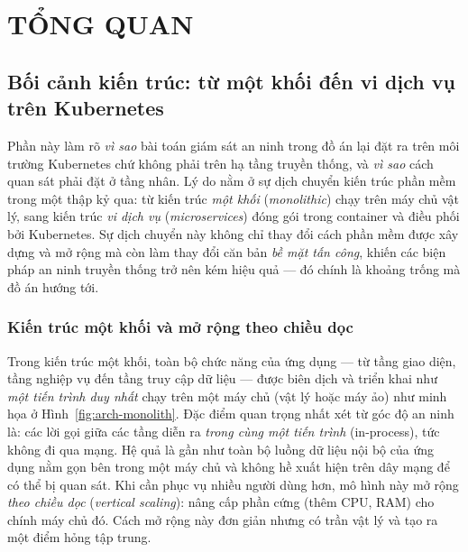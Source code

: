 
\chapter{TỔNG QUAN}
\label{ch:overview}

\section{Bối cảnh kiến trúc: từ một khối đến vi dịch vụ trên Kubernetes}
\label{sec:arch-context}

Phần này làm rõ \emph{vì sao} bài toán
giám sát an ninh trong đồ án lại đặt ra trên môi trường Kubernetes chứ không phải trên
hạ tầng truyền thống, và \emph{vì sao} cách quan sát phải đặt ở tầng nhân. Lý do nằm ở
sự dịch chuyển kiến trúc phần mềm trong một thập kỷ qua: từ kiến trúc \emph{một khối}
(\textit{monolithic}) chạy trên máy chủ vật lý, sang kiến trúc \emph{vi dịch vụ}
(\textit{microservices}) đóng gói trong container và điều phối bởi Kubernetes. Sự dịch
chuyển này không chỉ thay đổi cách phần mềm được xây dựng và mở rộng mà còn làm thay đổi
căn bản \emph{bề mặt tấn công}, khiến các biện pháp an ninh truyền thống trở nên kém hiệu
quả --- đó chính là khoảng trống mà đồ án hướng tới.

\subsection{Kiến trúc một khối và mở rộng theo chiều dọc}

Trong kiến trúc một khối, toàn bộ chức năng của ứng dụng --- từ tầng giao diện, tầng
nghiệp vụ đến tầng truy cập dữ liệu --- được biên dịch và triển khai như \emph{một tiến
trình duy nhất} chạy trên một máy chủ (vật lý hoặc máy ảo) như minh họa ở
Hình~\ref{fig:arch-monolith}. Đặc điểm quan trọng nhất xét từ góc độ an ninh là: các lời
gọi giữa các tầng diễn ra \emph{trong cùng một tiến trình} (in-process), tức không đi qua
mạng. Hệ quả là gần như toàn bộ luồng dữ liệu nội bộ của ứng dụng nằm gọn bên trong một
máy chủ và không hề xuất hiện trên dây mạng để có thể bị quan sát. Khi cần phục vụ nhiều
người dùng hơn, mô hình này mở rộng \emph{theo chiều dọc} (\textit{vertical scaling}):
nâng cấp phần cứng (thêm CPU, RAM) cho chính máy chủ đó. Cách mở rộng này đơn giản nhưng
có trần vật lý và tạo ra một điểm hỏng tập trung.

